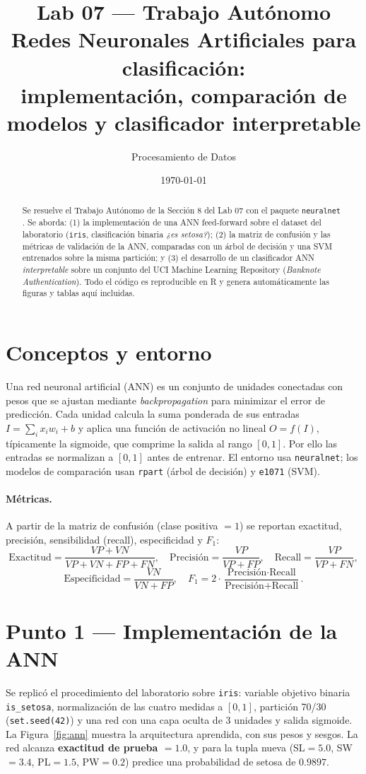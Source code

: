\documentclass[11pt]{article}
\title{\textbf{Lab 07 --- Trabajo Aut\'onomo}\\[4pt]
\large Redes Neuronales Artificiales para clasificaci\'on:\\
implementaci\'on, comparaci\'on de modelos y clasificador interpretable}
\author{Procesamiento de Datos}
\date{\today}
\begin{document}
\maketitle

\begin{abstract}
\noindent
Se resuelve el Trabajo Aut\'onomo de la Secci\'on 8 del Lab 07 con el
paquete \texttt{neuralnet} \cite{fritsch2019neuralnet, fritsch2010neuralnet}.
Se aborda: (1) la implementaci\'on de una ANN feed-forward sobre el dataset
del laboratorio (\texttt{iris}, clasificaci\'on binaria \emph{¿es setosa?});
(2) la matriz de confusi\'on y las m\'etricas de validaci\'on de la ANN,
comparadas con un \'arbol de decisi\'on y una SVM entrenados sobre la misma
partici\'on; y (3) el desarrollo de un clasificador ANN \emph{interpretable}
sobre un conjunto del UCI Machine Learning Repository \cite{Dua2019}
(\emph{Banknote Authentication}). Todo el c\'odigo es reproducible en R y
genera autom\'aticamente las figuras y tablas aqu\'i incluidas.
\end{abstract}

\section{Conceptos y entorno}
Una red neuronal artificial (ANN) es un conjunto de unidades conectadas con
pesos que se ajustan mediante \emph{backpropagation} para minimizar el error
de predicci\'on. Cada unidad calcula la suma ponderada de sus entradas
$I = \sum_i x_i w_i + b$ y aplica una funci\'on de activaci\'on no lineal
$O = f(I)$, t\'ipicamente la sigmoide, que comprime la salida al rango
$[0,1]$. Por ello las entradas se normalizan a $[0,1]$ antes de entrenar.
El entorno usa \texttt{neuralnet}; los modelos de comparaci\'on usan
\texttt{rpart} (\'arbol de decisi\'on) y \texttt{e1071} (SVM).

\paragraph{M\'etricas.} A partir de la matriz de confusi\'on (clase
positiva $=1$) se reportan exactitud, precisi\'on, sensibilidad (recall),
especificidad y $F_1$:
\[
\text{Exactitud}=\frac{VP+VN}{VP+VN+FP+FN},\quad
\text{Precisi\'on}=\frac{VP}{VP+FP},\quad
\text{Recall}=\frac{VP}{VP+FN},
\]
\[
\text{Especificidad}=\frac{VN}{VN+FP},\quad
F_1=2\cdot\frac{\text{Precisi\'on}\cdot\text{Recall}}{\text{Precisi\'on}+\text{Recall}}.
\]

\section{Punto 1 --- Implementaci\'on de la ANN}
Se replic\'o el procedimiento del laboratorio sobre \texttt{iris}: variable
objetivo binaria \texttt{is\_setosa}, normalizaci\'on de las cuatro medidas
a $[0,1]$, partici\'on 70/30 (\texttt{set.seed(42)}) y una red con una capa
oculta de 3 unidades y salida sigmoide. La Figura~\ref{fig:ann} muestra la
arquitectura aprendida, con sus pesos y sesgos. La red alcanza
\textbf{exactitud de prueba $=1.0$}, y para la tupla nueva
(SL$=5.0$, SW$=3.4$, PL$=1.5$, PW$=0.2$) predice una probabilidad de setosa
de $0.9897$.
\end{document}
